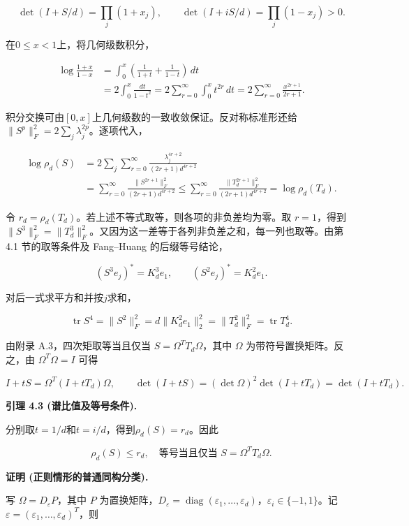 \documentclass[11pt,a4paper]{article}
\begin{document}
\[\det(I+S/d)=\prod_j(1+x_j),\qquad
\det(I+iS/d)=\prod_j(1-x_j)>0.\]

在\(0\le x<1\)上，将几何级数积分，

\[\begin{aligned}
\log\frac{1+x}{1-x}
&=\int_0^x\left(\frac1{1+t}+\frac1{1-t}\right)\,dt\\
&=2\int_0^x\frac{dt}{1-t^2}
=2\sum_{r=0}^\infty\int_0^x t^{2r}\,dt
=2\sum_{r=0}^\infty\frac{x^{2r+1}}{2r+1}.
\end{aligned}\]

积分交换可由\([0,x]\)上几何级数的一致收敛保证。反对称标准形还给\(\|S^p\|_F^2=2\sum_j\lambda_j^{2p}\)。逐项代入，

\[\begin{aligned}
\log\rho_d(S)
&=2\sum_j\sum_{r=0}^\infty
\frac{\lambda_j^{4r+2}}{(2r+1)d^{4r+2}}\\
&=\sum_{r=0}^\infty
\frac{\|S^{2r+1}\|_F^2}{(2r+1)d^{4r+2}}
\le\sum_{r=0}^\infty
\frac{\|T_d^{2r+1}\|_F^2}{(2r+1)d^{4r+2}}
=\log\rho_d(T_d).
\end{aligned}\]

令 \(r_d=\rho_d(T_d)\)。若上述不等式取等，则各项的非负差均为零。取 \(r=1\)，得到 \(\|S^3\|_F^2=\|T_d^3\|_F^2\)。又因为这一差等于各列非负差之和，每一列也取等。由第 4.1 节的取等条件及 Fang--Huang 的后缀等号结论，

\[(S^3e_j)^*=K_d^3e_1,\qquad
(S^2e_j)^*=K_d^2e_1.\]

对后一式求平方和并按\(j\)求和，

\[\operatorname{tr}S^4=\|S^2\|_F^2
=d\|K_d^2e_1\|_2^2
=\|T_d^2\|_F^2=\operatorname{tr}T_d^4.\]

由附录 A.3，四次矩取等当且仅当 \(S=\Omega^TT_d\Omega\)，其中 \(\Omega\) 为带符号置换矩阵。反之，由 \(\Omega^T\Omega=I\) 可得

\[I+tS=\Omega^T(I+tT_d)\Omega,\qquad
\det(I+tS)=(\det \Omega)^2\det(I+tT_d)=\det(I+tT_d).\]

\textbf{引理 4.3 (谱比值及等号条件).}

分别取\(t=1/d\)和\(t=i/d\)，得到\(\rho_d(S)=r_d\)。因此

\[\rho_d(S)\le r_d,
\quad\text{等号当且仅当 }S=\Omega^TT_d\Omega.\]

\textbf{证明 (正则情形的普通同构分类).}

写 \(\Omega=D_{\varepsilon}P\)，其中 \(P\) 为置换矩阵，\(D_{\varepsilon}=\operatorname{diag}(\varepsilon_1,\ldots,\varepsilon_d)\)，\(\varepsilon_i\in\{-1,1\}\)。记 \(\varepsilon=(\varepsilon_1,\ldots,\varepsilon_d)^T\)，则
\end{document}
